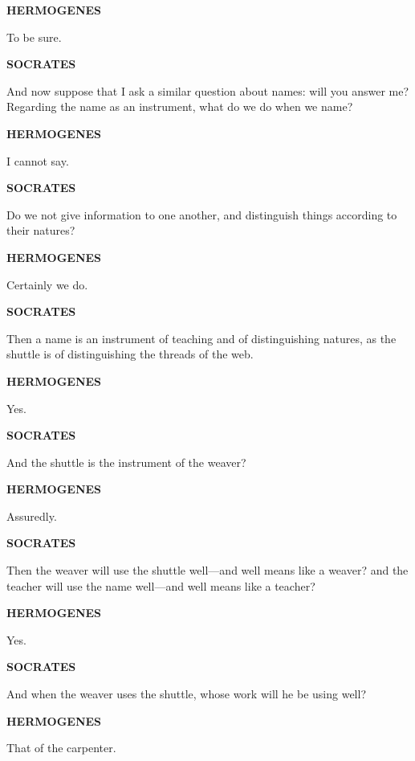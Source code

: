 \documentclass[11pt,letter]{article}
\begin{document}
\par \textbf{HERMOGENES}
\par   To be sure.

\par \textbf{SOCRATES}
\par   And now suppose that I ask a similar question about names:  will you answer me? Regarding the name as an instrument, what do we do when we name?

\par \textbf{HERMOGENES}
\par   I cannot say.

\par \textbf{SOCRATES}
\par   Do we not give information to one another, and distinguish things according to their natures?

\par \textbf{HERMOGENES}
\par   Certainly we do.

\par \textbf{SOCRATES}
\par   Then a name is an instrument of teaching and of distinguishing natures, as the shuttle is of distinguishing the threads of the web.

\par \textbf{HERMOGENES}
\par   Yes.

\par \textbf{SOCRATES}
\par   And the shuttle is the instrument of the weaver?

\par \textbf{HERMOGENES}
\par   Assuredly.

\par \textbf{SOCRATES}
\par   Then the weaver will use the shuttle well—and well means like a weaver? and the teacher will use the name well—and well means like a teacher?

\par \textbf{HERMOGENES}
\par   Yes.

\par \textbf{SOCRATES}
\par   And when the weaver uses the shuttle, whose work will he be using well?

\par \textbf{HERMOGENES}
\par   That of the carpenter.
\end{document}

